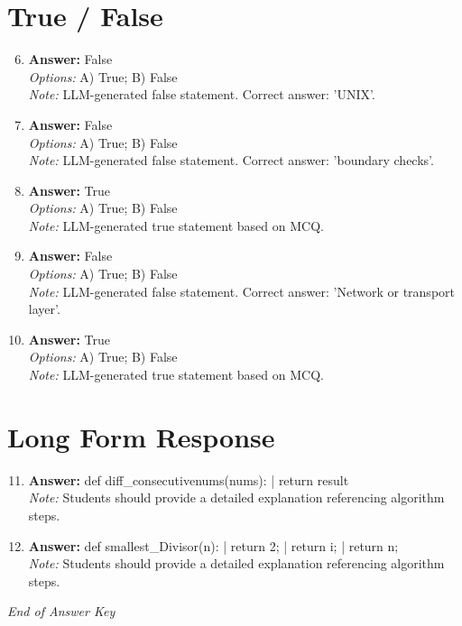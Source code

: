 \documentclass[12pt]{article}
\begin{document}
\section*{True / False}
\begin{enumerate}[label=\arabic*.]
\setcounter{enumi}{5}
\item \textbf{Answer:} False
\\ \textit{Options:} A) True; B) False
\\ \textit{Note:} LLM-generated false statement. Correct answer: 'UNIX'.
\item \textbf{Answer:} False
\\ \textit{Options:} A) True; B) False
\\ \textit{Note:} LLM-generated false statement. Correct answer: 'boundary checks'.
\item \textbf{Answer:} True
\\ \textit{Options:} A) True; B) False
\\ \textit{Note:} LLM-generated true statement based on MCQ.
\item \textbf{Answer:} False
\\ \textit{Options:} A) True; B) False
\\ \textit{Note:} LLM-generated false statement. Correct answer: 'Network or transport layer'.
\item \textbf{Answer:} True
\\ \textit{Options:} A) True; B) False
\\ \textit{Note:} LLM-generated true statement based on MCQ.
\end{enumerate}

\section*{Long Form Response}
\begin{enumerate}[label=\arabic*.]
\setcounter{enumi}{10}
\item \textbf{Answer:} def diff\_consecutivenums(nums): | return result
\\ \textit{Note:} Students should provide a detailed explanation referencing algorithm steps.
\item \textbf{Answer:} def smallest\_Divisor(n): | return 2; | return i; | return n;
\\ \textit{Note:} Students should provide a detailed explanation referencing algorithm steps.
\end{enumerate}

\vfill
\noindent\textit{End of Answer Key}
\end{document}
